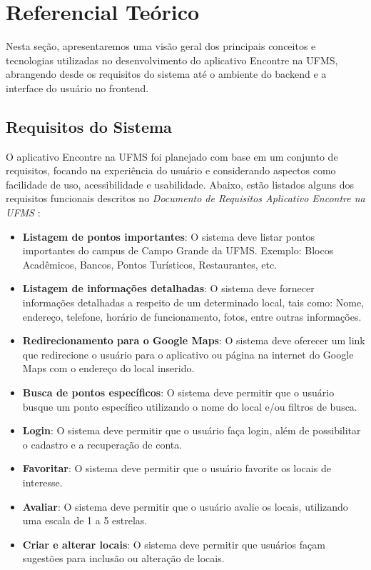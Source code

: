 \section{Referencial Teórico}

Nesta seção, apresentaremos uma visão geral dos principais conceitos e tecnologias utilizadas no desenvolvimento do aplicativo Encontre na UFMS, abrangendo desde os requisitos do sistema até o ambiente do backend e a interface do usuário no frontend.

\subsection{Requisitos do Sistema}

O aplicativo Encontre na UFMS foi planejado com base em um conjunto de requisitos, focando na experiência do usuário e considerando aspectos como facilidade de uso, acessibilidade e usabilidade. Abaixo, estão listados alguns dos requisitos funcionais descritos no \textit{Documento de Requisitos Aplicativo Encontre na UFMS} \cite{documentoRequisitosAplicativoEncontreNaUFMS}:

\begin{itemize}
  \item \textbf{Listagem de pontos importantes}: O sistema deve listar pontos importantes do campus de Campo Grande da UFMS. Exemplo: Blocos Acadêmicos, Bancos, Pontos Turísticos, Restaurantes, etc.
  \item \textbf{Listagem de informações detalhadas}: O sistema deve fornecer informações detalhadas a respeito de um determinado local, tais como: Nome, endereço, telefone, horário de funcionamento, fotos, entre outras informações.
  \item \textbf{Redirecionamento para o Google Maps}:  O sistema deve oferecer um link que redirecione o usuário para o aplicativo ou página na internet do Google Maps \cite{maps2005} com o endereço do local inserido.
  \item \textbf{Busca de pontos específicos}: O sistema deve permitir que o usuário busque um ponto específico utilizando o nome do local e/ou filtros de busca.
  \item \textbf{Login}: O sistema deve permitir que o usuário faça login, além de possibilitar o cadastro e a recuperação de conta.
  \item \textbf{Favoritar}:  O sistema deve permitir que o usuário favorite os locais de interesse.
  \item \textbf{Avaliar}:  O sistema deve permitir que o usuário avalie os locais, utilizando uma escala de 1 a 5 estrelas.
  \item \textbf{Criar e alterar locais}: O sistema deve permitir que usuários façam sugestões para inclusão ou alteração de locais.
\end{itemize}

